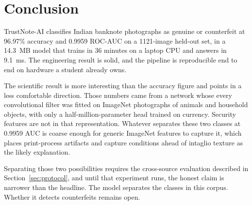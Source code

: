 \documentclass[conference]{IEEEtran}
\begin{document}
\section{Conclusion}

TrustNote-AI classifies Indian banknote photographs as genuine or counterfeit at
96.97\% accuracy and 0.9959 ROC-AUC on a 1121-image held-out set, in a 14.3~MB
model that trains in 36 minutes on a laptop CPU and answers in 9.1~ms. The
engineering result is solid, and the pipeline is reproducible end to end on
hardware a student already owns.

The scientific result is more interesting than the accuracy figure and points in
a less comfortable direction. Those numbers came from a network whose every
convolutional filter was fitted on ImageNet photographs of animals and household
objects, with only a half-million-parameter head trained on currency. Security
features are not in that representation. Whatever separates these two classes at
0.9959 AUC is coarse enough for generic ImageNet features to capture it, which
places print-process artifacts and capture conditions ahead of intaglio texture
as the likely explanation.

Separating those two possibilities requires the cross-source evaluation
described in Section~\ref{sec:protocol}, and until that experiment runs, the
honest claim is narrower than the headline. The model separates the classes in
this corpus. Whether it detects counterfeits remains open.



\end{document}
